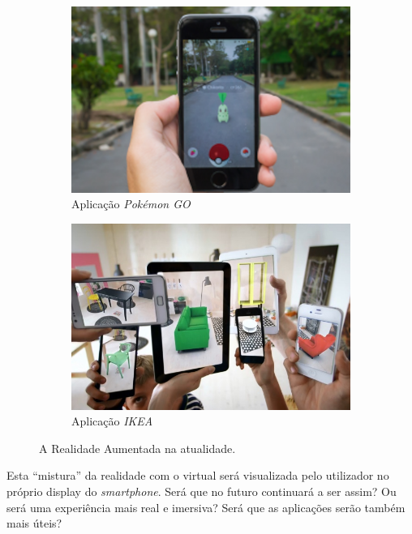 \documentclass{report}
\begin{document}
\begin{figure}[H]
    \begin{subfigure}[b]{.45\linewidth}
        \includegraphics[width=\linewidth]{pokemongo.png}
        \caption{Aplicação \textit{Pokémon GO}}\label{fig:pokemongo}
    \end{subfigure}
    \begin{subfigure}[b]{.45\linewidth}
        \includegraphics[width=\linewidth]{ikea.png}
        \caption{Aplicação \textit{IKEA}}\label{fig:ikea}
    \end{subfigure}
\caption{A Realidade Aumentada na atualidade.}
\label{fig:applications0}
\end{figure}

Esta “mistura” da realidade com o virtual será visualizada pelo utilizador no próprio display do \textit{smartphone}. Será que no futuro continuará a ser assim? Ou será uma experiência mais real e imersiva? Será que as aplicações serão também mais úteis?
\end{document}
